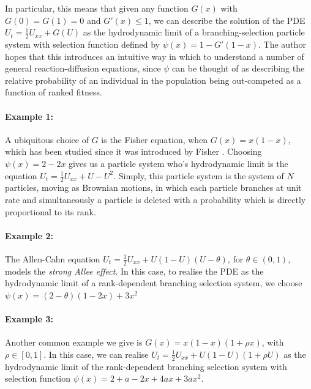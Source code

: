 \documentclass{article}
\newcommand{\B}[1]{\mathbb{#1}}
\begin{document}
In particular, this means that given any function $G(x)$ with $G(0)=G(1)=0$ and $G'(x)\leq 1$, we can describe the solution of the PDE $U_t = \frac12 U_{xx} + G(U)$ as the hydrodynamic limit of a branching-selection particle system with selection function defined by $\psi(x)=1-G'(1-x)$. The author hopes that this introduces an intuitive way in which to understand a number of general reaction-diffusion equations, since $\psi$ can be thought of as describing the relative probability of an individual in the population being out-competed as a function of ranked fitness.

\paragraph{Example 1:} A ubiquitous choice of $G$ is the Fisher equation, when $G(x)=x(1-x)$, which has been studied since it was introduced by Fisher \cite{fisher}. Choosing $\psi(x)=2-2x$ gives us a particle system who's hydrodynamic limit is the equation $U_t = \frac12 U_{xx} + U - U^2$. Simply, this particle system is the system of $N$ particles, moving as Brownian motions, in which each particle branches at unit rate and simultaneously a particle is deleted with a probability which is directly proportional to its rank. %

\paragraph{Example 2:} The Allen-Cahn equation $U_t=\frac12 U_{xx}+U(1-U)(U-\theta)$, for $\theta\in (0,1)$, models the \textit{strong Allee effect}. In this case, to realise the PDE as the hydrodynamic limit of a rank-dependent branching selection system, we choose $\psi(x)=(2-\theta)(1-2x)+3x^2$

\paragraph{Example 3:} Another common example we give is $G(x)=x(1-x)(1+\rho x)$, with $\rho\in [0,1]$. In this case, we can realise $U_t = \frac12 U_{xx} + U(1-U)(1+\rho U)$ as the hydrodynamic limit of the rank-dependent branching selection system with selection function $\psi(x)=2+a-2x+4ax+3ax^2$.
\end{document}
